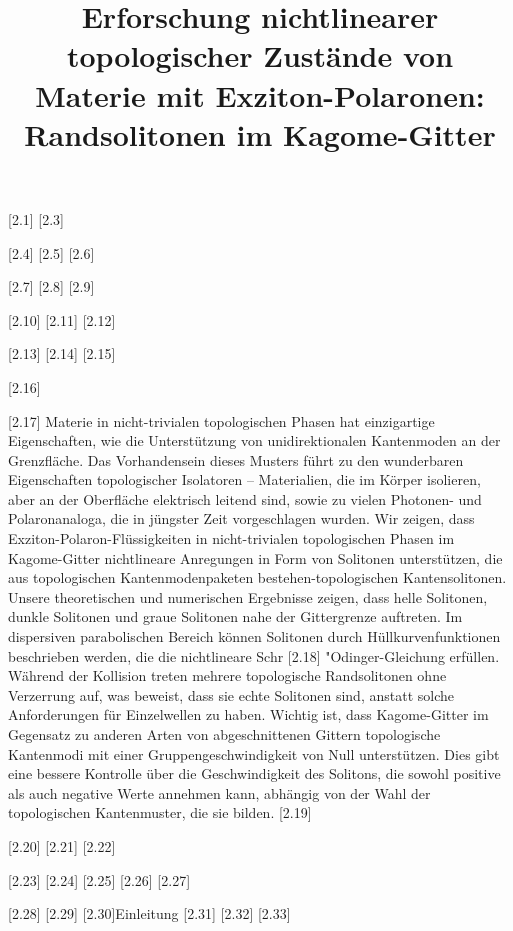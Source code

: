 \documentclass[
aps,
prl,
groupedaddress,
superscriptaddress,
floatfix,
notitlepage
]{revtex4-1}
\begin{document}
\title{Erforschung nichtlinearer topologischer Zustände von Materie mit Exziton-Polaronen: Randsolitonen im Kagome-Gitter}

[2.1]
[2.3]

[2.4]
[2.5]
[2.6]

[2.7]
[2.8]
[2.9]

[2.10]
[2.11]
[2.12]

[2.13]
[2.14]
[2.15]

[2.16]

[2.17]
Materie in nicht-trivialen topologischen Phasen hat einzigartige Eigenschaften, wie die Unterstützung von unidirektionalen Kantenmoden an der Grenzfläche. Das Vorhandensein dieses Musters führt zu den wunderbaren Eigenschaften topologischer Isolatoren – Materialien, die im Körper isolieren, aber an der Oberfläche elektrisch leitend sind, sowie zu vielen Photonen- und Polaronanaloga, die in jüngster Zeit vorgeschlagen wurden. Wir zeigen, dass Exziton-Polaron-Flüssigkeiten in nicht-trivialen topologischen Phasen im Kagome-Gitter nichtlineare Anregungen in Form von Solitonen unterstützen, die aus topologischen Kantenmodenpaketen bestehen-topologischen Kantensolitonen. Unsere theoretischen und numerischen Ergebnisse zeigen, dass helle Solitonen, dunkle Solitonen und graue Solitonen nahe der Gittergrenze auftreten. Im dispersiven parabolischen Bereich können Solitonen durch Hüllkurvenfunktionen beschrieben werden, die die nichtlineare Schr [2.18] "Odinger-Gleichung erfüllen.
Während der Kollision treten mehrere topologische Randsolitonen ohne Verzerrung auf, was beweist, dass sie echte Solitonen sind, anstatt solche Anforderungen für Einzelwellen zu haben. Wichtig ist, dass Kagome-Gitter im Gegensatz zu anderen Arten von abgeschnittenen Gittern topologische Kantenmodi mit einer Gruppengeschwindigkeit von Null unterstützen. Dies gibt eine bessere Kontrolle über die Geschwindigkeit des Solitons, die sowohl positive als auch negative Werte annehmen kann, abhängig von der Wahl der topologischen Kantenmuster, die sie bilden.
[2.19]


[2.20]
[2.21]
[2.22]

[2.23]
{[2.24] [2.25] [2.26] [2.27]}

[2.28]
[2.29]
[2.30]{Einleitung}
[2.31]{}
[2.32]
[2.33]
\end{document}
